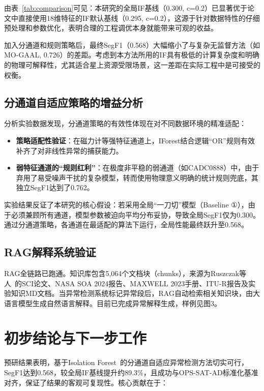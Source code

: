 \documentclass[conference]{IEEEtran}
\begin{document}
由表~\ref{tab:comparison}可见：本研究的全局IF基线（0.300, c=0.2）已显著优于论文中直接使用18维特征的IF默认基线（0.295, c=0.2），这源于针对数据特性的仔细预处理和参数优化，表明合理的工程调优本身就能带来可观的收益。

加入分通道和规则策略后，最终SegF1（0.568）大幅缩小了与复杂无监督方法（如MO-GAAL, 0.726）的差距。考虑到本方法所用的IF具有极低的计算复杂度和明确的物理可解释性，尤其适合星上资源受限场景，这一差距在实际工程中是可接受的权衡。

\subsection{分通道自适应策略的增益分析}

分析实验数据发现，分通道策略的有效性体现在对不同数据环境的精准适配：

\begin{itemize}
    \item \textbf{策略适配性验证}：在磁力计等强特征通道上，IForest结合逻辑``OR''规则有效补齐了对非线性异常的捕获能力。
    \item \textbf{弱特征通道的``规则红利''}：在极度非平稳的弱通道（如CADC0888）中，由于弃用了易受噪声干扰的复杂模型，转而使用物理意义明确的统计规则兜底，其独立SegF1达到了0.762。
\end{itemize}

实验结果反证了本研究的核心假设：若采用全局``一刀切''模型（Baseline ①），由于必须兼顾所有通道，模型参数被迫向平均分布妥协，导致全局SegF1仅为0.300。通过分通道策略，各通道在最适配的算法下运行，全局性能最终跃升至0.568。

\subsection{RAG解释系统验证}

RAG全链路已跑通。知识库包含5,064个文档块（chunks），来源为Ruszczak等人~\cite{Ruszczak2025}的SCI论文、NASA SOA 2024报告、MAXWELL 2023手册、ITU-R报告及实验知识MD文档。当异常检测系统标记异常段后，RAG自动检索相关知识块，由大语言模型生成自然语言解释。目前已完成异常解释生成，样例见图3。

\section{初步结论与下一步工作}

预研结果表明，基于Isolation Forest~\cite{Liu2008}的分通道自适应异常检测方法切实可行，SegF1达到0.568，较全局IF基线提升约89.3\%，且成功与OPS-SAT-AD标准化基准对齐，保证了结果的客观可复现性。核心贡献在于：
\end{document}

